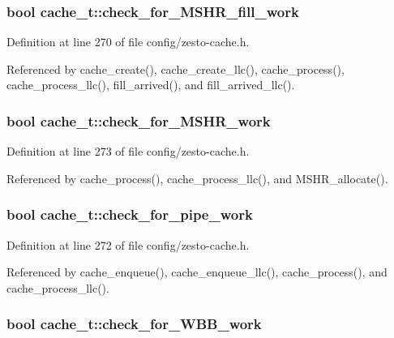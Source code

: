 \subsubsection[{check\_\-for\_\-MSHR\_\-fill\_\-work}]{\setlength{\rightskip}{0pt plus 5cm}bool {\bf cache\_\-t::check\_\-for\_\-MSHR\_\-fill\_\-work}}\label{structcache__t_b8201815f5380945b6d4da1ba62be66d}




Definition at line 270 of file config/zesto-cache.h.

Referenced by cache\_\-create(), cache\_\-create\_\-llc(), cache\_\-process(), cache\_\-process\_\-llc(), fill\_\-arrived(), and fill\_\-arrived\_\-llc().
\subsubsection[{check\_\-for\_\-MSHR\_\-work}]{\setlength{\rightskip}{0pt plus 5cm}bool {\bf cache\_\-t::check\_\-for\_\-MSHR\_\-work}}\label{structcache__t_b48fed91578905ee5e6f3dd73b269eea}




Definition at line 273 of file config/zesto-cache.h.

Referenced by cache\_\-process(), cache\_\-process\_\-llc(), and MSHR\_\-allocate().
\subsubsection[{check\_\-for\_\-pipe\_\-work}]{\setlength{\rightskip}{0pt plus 5cm}bool {\bf cache\_\-t::check\_\-for\_\-pipe\_\-work}}\label{structcache__t_1b895811cc2aeaa4b7484c1f5b118218}




Definition at line 272 of file config/zesto-cache.h.

Referenced by cache\_\-enqueue(), cache\_\-enqueue\_\-llc(), cache\_\-process(), and cache\_\-process\_\-llc().
\subsubsection[{check\_\-for\_\-WBB\_\-work}]{\setlength{\rightskip}{0pt plus 5cm}bool {\bf cache\_\-t::check\_\-for\_\-WBB\_\-work}}\label{structcache__t_6e96a811c9ea9ee5a30ac1febff9e9c1}





